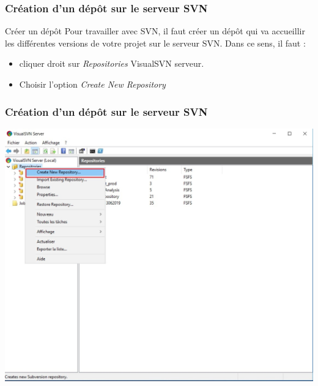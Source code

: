 \documentclass{beamer}
\begin{document}
\begin{frame}
\frametitle{Création d'un dépôt sur le serveur SVN }
\begin{block}{Créer un dépôt}
Pour travailler avec SVN, il faut créer un dépôt  qui va accueillir les différentes versions de votre projet sur le serveur SVN. Dans ce sens, il faut :
\begin{itemize}
\item cliquer droit sur \alert{\textit{Repositories}} VisualSVN serveur.
\item Choisir l'option \alert{\textit{Create New Repository}}
\end{itemize}
\end{block}

\end{frame}
\begin{frame}
\frametitle{Création d'un dépôt sur le serveur SVN}
\includegraphics[scale=.4]{../images/server5.jpg}
\end{frame}
\end{document}
